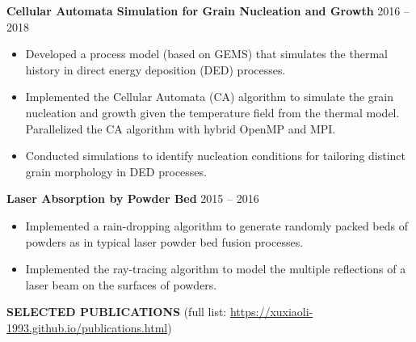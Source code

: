 \documentclass[11pt, letterpaper]{article}
\begin{document}
\vspace{3pt}

\textbf{Cellular Automata Simulation for Grain Nucleation and Growth} \hfill 2016 -- 2018
\begin{itemize}[leftmargin=*, labelsep=5mm]
   \item Developed a process model (based on GEMS) that simulates the thermal history in direct
      energy deposition (DED) processes.
   \item Implemented the Cellular Automata (CA) algorithm to simulate the grain nucleation and
      growth given the temperature field from the thermal model. Parallelized the CA algorithm with
      hybrid OpenMP and MPI.
   \item Conducted simulations to identify nucleation conditions for tailoring distinct
      grain morphology in DED processes.
\end{itemize}

\vspace{3pt}

\textbf{Laser Absorption by Powder Bed} \hfill 2015 -- 2016
\begin{itemize}[leftmargin=*, labelsep=5mm]
   \item Implemented a rain-dropping algorithm to generate randomly packed beds of powders as in
      typical laser powder bed fusion processes.
   \item Implemented the ray-tracing algorithm to model the multiple reflections of a laser beam on
      the surfaces of powders.
\end{itemize}

\vspace{9pt}

\textbf{SELECTED PUBLICATIONS} \hfill (full list:  
\href{https://xuxiaoli-1993.github.io/publications.html}
{https://xuxiaoli-1993.github.io/publications.html})

\fullrule
\end{document}
